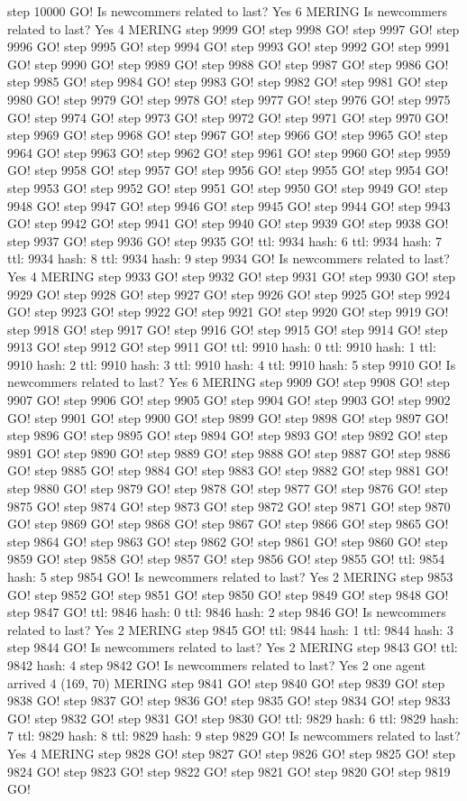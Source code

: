step 10000 GO! Is newcommers related to last? Yes 6 MERING Is newcommers related to last? Yes 4 MERING step 9999 GO! step 9998 GO! step 9997 GO! step 9996 GO! step 9995 GO! step 9994 GO! step 9993 GO! step 9992 GO! step 9991 GO! step 9990 GO! step 9989 GO! step 9988 GO! step 9987 GO! step 9986 GO! step 9985 GO! step 9984 GO! step 9983 GO! step 9982 GO! step 9981 GO! step 9980 GO! step 9979 GO! step 9978 GO! step 9977 GO! step 9976 GO! step 9975 GO! step 9974 GO! step 9973 GO! step 9972 GO! step 9971 GO! step 9970 GO! step 9969 GO! step 9968 GO! step 9967 GO! step 9966 GO! step 9965 GO! step 9964 GO! step 9963 GO! step 9962 GO! step 9961 GO! step 9960 GO! step 9959 GO! step 9958 GO! step 9957 GO! step 9956 GO! step 9955 GO! step 9954 GO! step 9953 GO! step 9952 GO! step 9951 GO! step 9950 GO! step 9949 GO! step 9948 GO! step 9947 GO! step 9946 GO! step 9945 GO! step 9944 GO! step 9943 GO! step 9942 GO! step 9941 GO! step 9940 GO! step 9939 GO! step 9938 GO! step 9937 GO! step 9936 GO! step 9935 GO! ttl: 9934 hash: 6 ttl: 9934 hash: 7 ttl: 9934 hash: 8 ttl: 9934 hash: 9 step 9934 GO! Is newcommers related to last? Yes 4 MERING step 9933 GO! step 9932 GO! step 9931 GO! step 9930 GO! step 9929 GO! step 9928 GO! step 9927 GO! step 9926 GO! step 9925 GO! step 9924 GO! step 9923 GO! step 9922 GO! step 9921 GO! step 9920 GO! step 9919 GO! step 9918 GO! step 9917 GO! step 9916 GO! step 9915 GO! step 9914 GO! step 9913 GO! step 9912 GO! step 9911 GO! ttl: 9910 hash: 0 ttl: 9910 hash: 1 ttl: 9910 hash: 2 ttl: 9910 hash: 3 ttl: 9910 hash: 4 ttl: 9910 hash: 5 step 9910 GO! Is newcommers related to last? Yes 6 MERING step 9909 GO! step 9908 GO! step 9907 GO! step 9906 GO! step 9905 GO! step 9904 GO! step 9903 GO! step 9902 GO! step 9901 GO! step 9900 GO! step 9899 GO! step 9898 GO! step 9897 GO! step 9896 GO! step 9895 GO! step 9894 GO! step 9893 GO! step 9892 GO! step 9891 GO! step 9890 GO! step 9889 GO! step 9888 GO! step 9887 GO! step 9886 GO! step 9885 GO! step 9884 GO! step 9883 GO! step 9882 GO! step 9881 GO! step 9880 GO! step 9879 GO! step 9878 GO! step 9877 GO! step 9876 GO! step 9875 GO! step 9874 GO! step 9873 GO! step 9872 GO! step 9871 GO! step 9870 GO! step 9869 GO! step 9868 GO! step 9867 GO! step 9866 GO! step 9865 GO! step 9864 GO! step 9863 GO! step 9862 GO! step 9861 GO! step 9860 GO! step 9859 GO! step 9858 GO! step 9857 GO! step 9856 GO! step 9855 GO! ttl: 9854 hash: 5 step 9854 GO! Is newcommers related to last? Yes 2 MERING step 9853 GO! step 9852 GO! step 9851 GO! step 9850 GO! step 9849 GO! step 9848 GO! step 9847 GO! ttl: 9846 hash: 0 ttl: 9846 hash: 2 step 9846 GO! Is newcommers related to last? Yes 2 MERING step 9845 GO! ttl: 9844 hash: 1 ttl: 9844 hash: 3 step 9844 GO! Is newcommers related to last? Yes 2 MERING step 9843 GO! ttl: 9842 hash: 4 step 9842 GO! Is newcommers related to last? Yes 2 one agent arrived 4 (169, 70) MERING step 9841 GO! step 9840 GO! step 9839 GO! step 9838 GO! step 9837 GO! step 9836 GO! step 9835 GO! step 9834 GO! step 9833 GO! step 9832 GO! step 9831 GO! step 9830 GO! ttl: 9829 hash: 6 ttl: 9829 hash: 7 ttl: 9829 hash: 8 ttl: 9829 hash: 9 step 9829 GO! Is newcommers related to last? Yes 4 MERING step 9828 GO! step 9827 GO! step 9826 GO! step 9825 GO! step 9824 GO! step 9823 GO! step 9822 GO! step 9821 GO! step 9820 GO! step 9819 GO! 